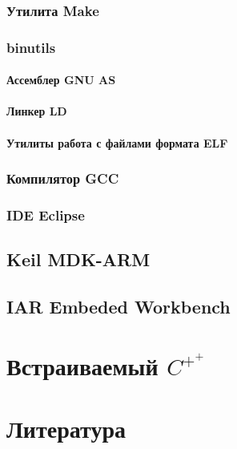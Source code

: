 \documentclass[oneside,12pt]{book}
\newcommand{\cpp}{$C^{+^{+}}$}
\begin{document}
\section{Утилита Make}
\section{binutils}
\subsection{Ассемблер GNU AS}
\subsection{Линкер LD}
\subsection{Утилиты работа с файлами формата ELF}
\section{Компилятор GCC}
\section{IDE Eclipse}
\chapter{Keil MDK-ARM}
\chapter{IAR Embeded Workbench}

\part{Встраиваемый \cpp}

\part{Литература}
\end{document}
